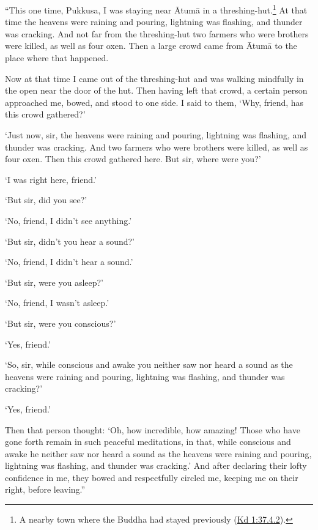 \documentclass[12pt,openany]{book}%
\begin{document}
“This one time, Pukkusa, I was staying near \textsanskrit{Ātumā} in a threshing-hut.\footnote{A nearby town where the Buddha had stayed previously (\href{https://suttacentral.net/pli-tv-kd1/en/sujato\#37.4.2}{Kd 1:37.4.2}). } At that time the heavens were raining and pouring, lightning was flashing, and thunder was cracking. And not far from the threshing-hut two farmers who were brothers were killed, as well as four oxen. Then a large crowd came from \textsanskrit{Ātumā} to the place where that happened. 

Now at that time I came out of the threshing-hut and was walking mindfully in the open near the door of the hut. Then having left that crowd, a certain person approached me, bowed, and stood to one side. I said to them, ‘Why, friend, has this crowd gathered?’ 

‘Just now, sir, the heavens were raining and pouring, lightning was flashing, and thunder was cracking. And two farmers who were brothers were killed, as well as four oxen. Then this crowd gathered here. But sir, where were you?’ 

‘I was right here, friend.’ 

‘But sir, did you see?’ 

‘No, friend, I didn’t see anything.’ 

‘But sir, didn’t you hear a sound?’ 

‘No, friend, I didn’t hear a sound.’ 

‘But sir, were you asleep?’ 

‘No, friend, I wasn’t asleep.’ 

‘But sir, were you conscious?’ 

‘Yes, friend.’ 

‘So, sir, while conscious and awake you neither saw nor heard a sound as the heavens were raining and pouring, lightning was flashing, and thunder was cracking?’ 

‘Yes, friend.’ 

Then that person thought: ‘Oh, how incredible, how amazing! Those who have gone forth remain in such peaceful meditations, in that, while conscious and awake he neither saw nor heard a sound as the heavens were raining and pouring, lightning was flashing, and thunder was cracking.’ And after declaring their lofty confidence in me, they bowed and respectfully circled me, keeping me on their right, before leaving.” 
\end{document}
